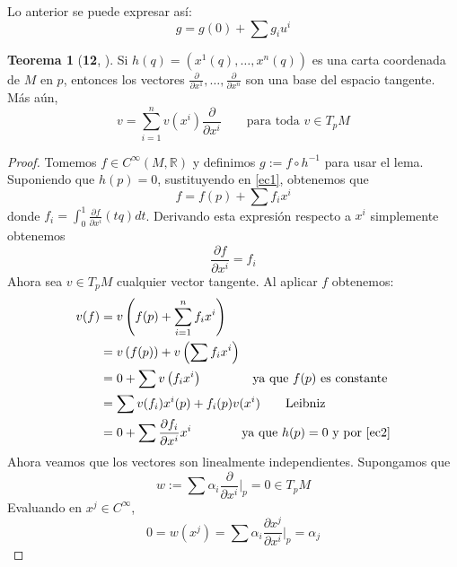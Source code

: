 \documentclass[spanish]{book}
\theoremstyle{definition}
\newtheorem*{teo}{Teorema}
\newcommand{\R}{\mathbb{R}}
\newcommand{\Cinf}{C^\infty}
\begin{document}
Lo anterior se puede expresar así:
\begin{equation}\label{ec1}
	g=g(0)+\sum g_iu^i
\end{equation}
\begin{teo}[\textbf{12}, \cite{ONeill}]\label{teo:base}
	Si $h(q)=(x^1(q),\ldots,x^n(q))$ es una carta coordenada de $M$ en $p$, entonces los vectores $\frac{\partial}{\partial x^1}, \ldots, \frac{\partial}{\partial x^n}
	$ son una base del espacio tangente. Más aún,
	\[v = \sum_{i=1}^n v(x^i) \frac{\partial}{\partial x^i} \qquad \text{para toda } v \in T_pM\]
\end{teo}
\begin{proof}
	Tomemos $f\in\Cinf(M,\R)$ y definimos $g:=f\circ h^{-1}$ para usar el lema. Suponiendo que $h(p)=0$, sustituyendo en \ref{ec1}, obtenemos que 
	\[f=f(p)+\sum f_ix^i\]
	donde $f_i=\int_0^1\frac{\partial f}{\partial x^i}(tq)dt$. Derivando esta expresión respecto a $x^i$ simplemente obtenemos
	\begin{equation}\label{ec2}
		\frac{\partial f}{\partial x^i}=f_i
	\end{equation}
	Ahora sea $v\in T_pM$ cualquier vector tangente. Al aplicar $f$ obtenemos:
	\begin{align*}
		v(f) &= v\left(f(p)+\sum_{i=1}^nf_ix^i\right) \\
		&= v\left(f(p)\right)+v\left(\sum f_i x^i\right) \\
		&=0+ \sum v\left(f_i x^i\right)\qquad\qquad\text{ya que }f(p)\text{ es constante} \\
		&=\sum v(f_i)x^i(p)+f_i(p)v(x^i)\qquad\text{Leibniz}\\
		&=0+\sum \frac{\partial f_i}{\partial x^i}x^i\qquad\qquad\text{ya que }h(p)=0\text{ y por }\ref{ec2}
	\end{align*}
	Ahora veamos que los vectores son linealmente independientes. Supongamos que
	\[w:=\sum\alpha_i\frac{\partial}{\partial{x^i}}\Bigg|_{p}=0\in T_pM\]
	Evaluando en $x^j\in\Cinf$,
	\[0=w(x^j)=\sum\alpha_i\frac{\partial x^j}{\partial{x^i}}\Bigg|_{p}=\alpha_j\]
\end{proof}
\end{document}
